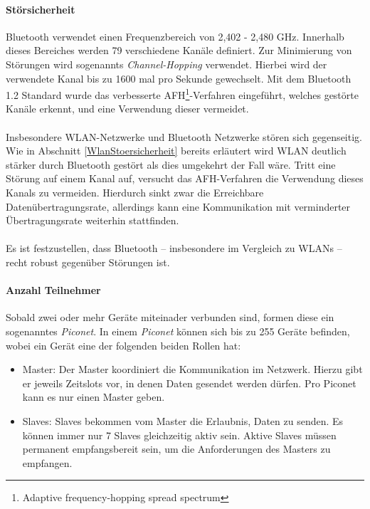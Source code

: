         \paragraph{Störsicherheit}
            Bluetooth verwendet einen Frequenzbereich von 2,402 - 2,480 GHz. Innerhalb
            dieses Bereiches werden 79 verschiedene Kanäle definiert. Zur Minimierung
            von Störungen wird sogenannts \textsl{Channel-Hopping} verwendet. Hierbei
            wird der verwendete Kanal bis zu 1600 mal pro Sekunde gewechselt. Mit dem
            Bluetooth 1.2 Standard wurde das verbesserte  
            AFH\footnote{Adaptive frequency-hopping spread spectrum}-Verfahren 
            eingeführt, welches gestörte Kanäle erkennt, und eine Verwendung
            dieser vermeidet.\\
            \\
            Insbesondere WLAN-Netzwerke und Bluetooth Netzwerke stören sich 
            gegenseitig. Wie in Abschnitt \ref{WlanStoersicherheit} bereits
            erläutert wird WLAN deutlich stärker durch Bluetooth gestört
            als dies umgekehrt der Fall wäre. Tritt eine Störung auf einem
            Kanal auf, versucht das AFH-Verfahren die Verwendung dieses
            Kanals zu vermeiden. Hierdurch sinkt zwar die Erreichbare
            Datenübertragungsrate, allerdings kann eine Kommunikation mit
            verminderter Übertragungsrate weiterhin stattfinden.\\
             \\
             Es ist festzustellen, dass Bluetooth -- insbesondere im Vergleich
             zu WLANs -- recht robust gegenüber Störungen ist.

        \paragraph{Anzahl Teilnehmer}
            Sobald zwei oder mehr Geräte miteinader verbunden sind, formen diese ein
            sogenanntes \textsl{Piconet}. In einem \textsl{Piconet} können sich bis
            zu 255 Geräte befinden, wobei ein Gerät eine der folgenden beiden Rollen
            hat:

            \begin{itemize}
                \item{Master:} Der Master koordiniert die Kommunikation im Netzwerk.
                               Hierzu gibt er jeweils Zeitslots vor, in denen
                               Daten gesendet werden dürfen. Pro Piconet kann
                               es nur einen Master geben.
                \item{Slaves:} Slaves bekommen vom Master die Erlaubnis, Daten zu senden.
                               Es können immer nur 7 Slaves gleichzeitig aktiv sein.
                               Aktive Slaves müssen permanent empfangsbereit sein,
                               um die Anforderungen des Masters zu empfangen. 
            \end{itemize}

